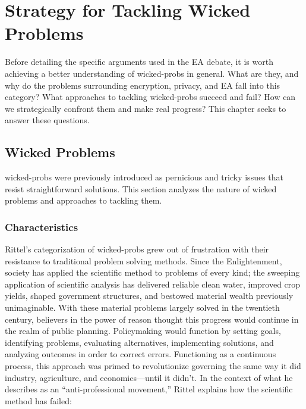\chapter{Strategy for Tackling Wicked Problems}
\label{chap-policy}

Before detailing the specific arguments used in the \ac{EA} debate, it is worth achieving a better understanding of
\acp{wicked-prob} in general. What are they, and why do the problems surrounding encryption, privacy, and \ac{EA} fall
into this category? What approaches to tackling \acp{wicked-prob} succeed and fail? How can we strategically confront
them and make real progress? This chapter seeks to answer these questions.


\section{Wicked Problems}

\Acp{wicked-prob} were previously introduced as pernicious and tricky issues that resist straightforward solutions.
This section analyzes the nature of wicked problems and approaches to tackling them.

\subsection{Characteristics}
\label{wicked-characteristics}

Rittel's categorization of \acp{wicked-prob} grew out of frustration with their resistance to traditional problem
solving methods. Since the Enlightenment, society has applied the scientific method to problems of every kind; the
sweeping application of scientific analysis has delivered reliable clean water, improved crop yields, shaped government
structures, and bestowed material wealth previously unimaginable. With these material problems largely solved in the
twentieth century, believers in the power of reason thought this progress would continue in the realm of public
planning. Policymaking would function by setting goals, identifying problems, evaluating alternatives, implementing
solutions, and analyzing outcomes in order to correct errors. Functioning as a continuous process, this approach was
primed to revolutionize governing the same way it did industry, agriculture, and economics---until it didn't. In the
context of what he describes as an ``anti-professional movement,'' Rittel explains how the scientific method has failed:

